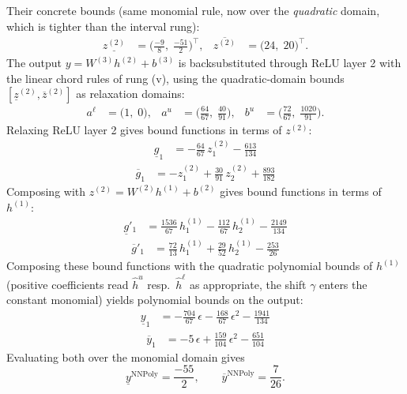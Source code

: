 \documentclass[11pt]{article}
\begin{document}
Their concrete bounds (same monomial rule, now over the \emph{quadratic} domain, which is tighter than the interval rung):
\begin{align*}
\underline{z^{(2)}} &= \bigl(\frac{-9}{8},\; \frac{-51}{2}\bigr)^{\!\top}, & \overline{z^{(2)}} &= \bigl(24,\; 20\bigr)^{\!\top}.
\end{align*}
The output $y = W^{(3)} h^{(2)} + b^{(3)}$ is backsubstituted through ReLU layer 2 with the linear chord rules of rung (v), using the quadratic-domain bounds
$[\underline{z}^{(2)}, \overline{z}^{(2)}]$ as relaxation domains:
\begin{align*}
a^{\ell} &= \bigl(1,\; 0\bigr), & a^{u} &= \bigl(\frac{64}{67},\; \frac{40}{91}\bigr), & b^{u} &= \bigl(\frac{72}{67},\; \frac{1020}{91}\bigr).
\end{align*}
Relaxing ReLU layer 2 gives bound functions in terms of $z^{(2)}$:
\begin{align*}
\underline{g}_{1} &= -\frac{64}{67}\,z^{(2)}_{1} - \frac{613}{134}
\end{align*}
\begin{align*}
\overline{g}_{1} &= -z^{(2)}_{1} + \frac{30}{91}\,z^{(2)}_{2} + \frac{893}{182}
\end{align*}
Composing with $z^{(2)} = W^{(2)} h^{(1)} + b^{(2)}$ gives bound functions in terms of $h^{(1)}$:
\begin{align*}
\underline{g}'_{1} &= \frac{1536}{67}\,h^{(1)}_{1} - \frac{112}{67}\,h^{(1)}_{2} - \frac{2149}{134}
\end{align*}
\begin{align*}
\overline{g}'_{1} &= \frac{72}{13}\,h^{(1)}_{1} + \frac{29}{52}\,h^{(1)}_{2} - \frac{253}{26}
\end{align*}
Composing these bound functions with the quadratic polynomial bounds of $h^{(1)}$ (positive
coefficients read $\hat{h}^{u}$ resp.\ $\hat{h}^{\ell}$ as appropriate, the shift $\gamma$ enters the
constant monomial) yields polynomial bounds on the output:
\begin{align*}
\underline{y}_{1} &= -\frac{704}{67}\,\epsilon - \frac{168}{67}\,\epsilon^2 - \frac{1941}{134}
\end{align*}
\begin{align*}
\overline{y}_{1} &= -5\,\epsilon + \frac{159}{104}\,\epsilon^2 - \frac{651}{104}
\end{align*}
Evaluating both over the monomial domain gives
\begin{equation*}
\underline{y}^{\text{NNPoly}} = \frac{-55}{2}, \qquad \overline{y}^{\text{NNPoly}} = \frac{7}{26}.
\end{equation*}
\end{document}
